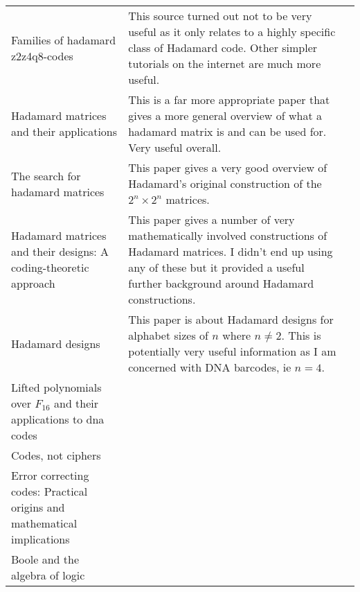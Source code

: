 \documentclass{article}
\begin{document}
{\begin{center}
\begin{longtable}{p{5cm} p{5cm} p{5cm}}
    Families of hadamard z2z4q8-codes \citep*{HadamardZ2Z2012RioRifa} & 

    This source turned out not to be very useful as it only relates to a highly
    specific class of Hadamard code. Other simpler tutorials on the internet
    are much more useful. \\

    Hadamard matrices and their applications \citep*{HadamardMatrices1978HedayatWallis} &

    This is a far more appropriate paper that gives a more general overview of
    what a hadamard matrix is and can be used for. Very useful overall. \\

    The search for hadamard matrices \citep*{HadamardSearch1963GolombBaumert} &

    This paper gives a very good overview of Hadamard's original construction
    of the $2^n \times 2^n$ matrices. \\

    Hadamard matrices and their designs: A coding-theoretic approach \citep*{HadamardCodingTheoretic1992AssmusKey} & 

    This paper gives a number of very mathematically involved constructions of
    Hadamard matrices. I didn't end up using any of these but it provided a
    useful further background around Hadamard constructions. \\

    Hadamard designs \citep*{HadamardDesigns1972Spence} & 

    This paper is about Hadamard designs for alphabet sizes of $n$ where $n
    \neq 2$. This is potentially very useful information as I am concerned with
    DNA barcodes, ie $n = 4$. \\

    Lifted polynomials over ${F}_{16}$ and their applications to dna codes \citep*{PolynomialDNA2013OztasSiap} & 

    \\

    Codes, not ciphers \citep*{CodesCiphers1010Baylis} &

    \\

    Error correcting codes: Practical origins and mathematical implications \citep*{CodesOrigins1978Pless} &

    \\

    Boole and the algebra of logic \citep*{BooleRecords1956Kneale} &


\end{longtable}
\end{center}}
\end{document}
